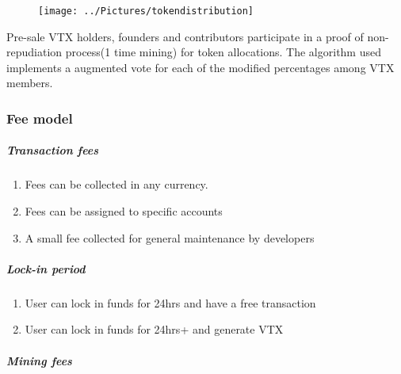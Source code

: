 \documentclass[]{article}
\begin{document}
\begin{figure}
	\centering
	\texttt{[image: ../Pictures/tokendistribution]}
	\caption{}
	\label{fig:tokendistribution}
\end{figure}

Pre-sale VTX holders, founders and contributors participate in a proof of non-repudiation process(1 time mining) for token allocations.
The algorithm used implements a augmented vote for each of the 	modified percentages among VTX members.


\subsubsection{Fee model}
\subparagraph{Transaction fees\\}
\begin{enumerate}
	\item Fees can be collected in any currency.\\
	\item Fees can be assigned to specific accounts\\
	\item A small fee collected for general maintenance by developers\\
\end{enumerate}
\subparagraph{Lock-in period\\}
\begin{enumerate}
	\item User can lock in funds for 24hrs and have a free transaction\\
	\item User can lock in funds for 24hrs+ and generate VTX \\
\end{enumerate}
\subparagraph{Mining fees}
\end{document}
